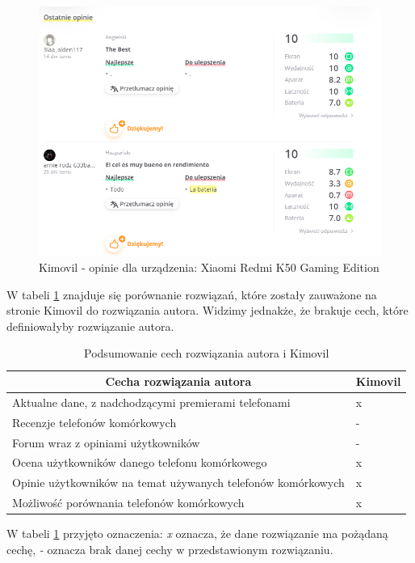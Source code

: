 \begin{figure}[H]
    \centering
    \includegraphics[scale=0.5]{img/Kimovil/opinieKimovil.png}
    \caption{Kimovil - opinie dla urządzenia: Xiaomi Redmi K50 Gaming Edition}
    \label{kimovil_4}
\end{figure}
W tabeli \ref*{comparison_kimovil} znajduje się porównanie rozwiązań, które zostały zauważone na stronie Kimovil do rozwiązania autora. Widzimy jednakże, że brakuje cech, które definiowałyby rozwiązanie autora.
\begin{table}[H]
    \centering
    \begin{tabular}{|l|l|}
        \hline
        \multicolumn{1}{|c|}{Cecha rozwiązania autora}    & \multicolumn{1}{c|}{Kimovil} \\ \hline
        Aktualne dane, z nadchodzącymi premierami telefonami & x                             \\ \hline
        Recenzje telefonów komórkowych                                  & -                                \\ \hline
        Forum wraz z opiniami użytkowników                   & -                                \\ \hline
        Ocena użytkowników danego telefonu komórkowego                  & x                             \\ \hline
        Opinie użytkowników na temat używanych telefonów komórkowych    & x                                 \\ \hline
        Możliwość porównania telefonów komórkowych                      & x                                \\ \hline
    \end{tabular}
    \caption{Podsumowanie cech rozwiązania autora i Kimovil}
    \label{comparison_kimovil}
\end{table}
W tabeli \ref{comparison_kimovil} przyjęto oznaczenia: \textit{x} oznacza, że dane rozwiązanie ma pożądaną cechę, \textit{-} oznacza brak danej cechy w przedstawionym rozwiązaniu.

